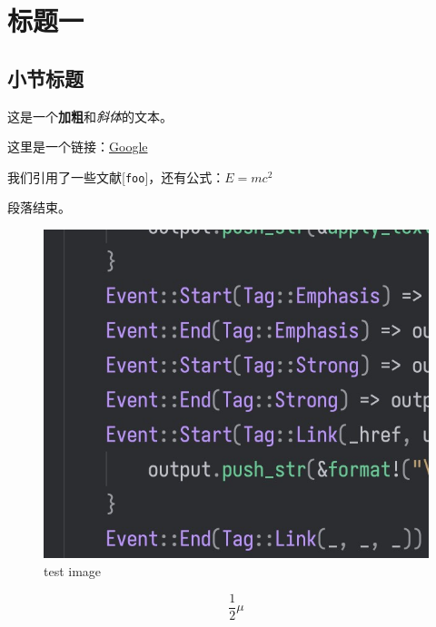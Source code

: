 \chapter{标题一}
\section{小节标题}
这是一个\textbf{加粗}和\textit{斜体}的文本。

这里是一个链接：\href{https://www.google.com}{Google}

我们引用了一些文献[\texttt{foo}]，还有公式：$E = mc^2$

段落结束。

\begin{figure}[h]
\includegraphics{images/test.jpg}
\caption{test image}
\label{fig:images/test.jpg}
\end{figure}


\begin{equation}
\frac{1}{2}\mu
\label{eq:hhhhh}
\end{equation}

